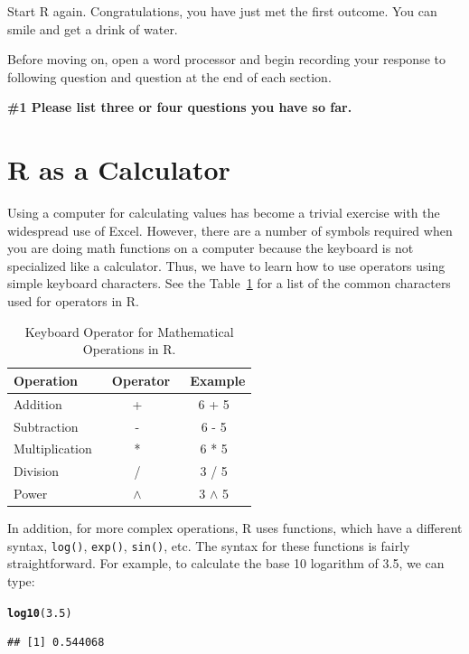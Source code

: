 \documentclass{tufte-handout}\usepackage[]{graphicx}\usepackage[]{xcolor}
\makeatletter
\newcommand{\hlnum}[1]{\textcolor[rgb]{0.686,0.059,0.569}{#1}}%
\newcommand{\hlstd}[1]{\textcolor[rgb]{0.345,0.345,0.345}{#1}}%
\newcommand{\hlkwd}[1]{\textcolor[rgb]{0.737,0.353,0.396}{\textbf{#1}}}%
\newenvironment{kframe}{%
 \def\at@end@of@kframe{}%
 \ifinner\ifhmode%
  \def\at@end@of@kframe{\end{minipage}}%
  \begin{minipage}{\columnwidth}%
 \fi\fi%
 \def\FrameCommand##1{\hskip\@totalleftmargin \hskip-\fboxsep
 \colorbox{shadecolor}{##1}\hskip-\fboxsep
     \hskip-\linewidth \hskip-\@totalleftmargin \hskip\columnwidth}%
 \MakeFramed {\advance\hsize-\width
   \@totalleftmargin\z@ \linewidth\hsize
   \@setminipage}}%
 {\par\unskip\endMakeFramed%
 \at@end@of@kframe}
\newenvironment{knitrout}{}{} %
\makeatother
\begin{document}
Start R again. Congratulations, you have just met the first outcome. You can smile and get a drink of water.

Before moving on, open a word processor and begin recording your response to following question and question at the end of each section.

\bigskip
\noindent \textbf{\#1 Please list three or four questions you have so far. }

\section{R as a Calculator}

Using a computer for calculating values has become a trivial exercise with the widespread use of Excel. However, there are a number of symbols required when you are doing math functions on a computer because the keyboard is not specialized like a calculator. Thus, we have to learn how to use operators using simple keyboard characters. See the Table~\ref{tab:KeyboardOperators} for a list of the common characters used for operators in R.

\begin{table}
	\begin{center}
	\begin{tabular}{lcc}
		\toprule
Operation &\ Operator &\ Example \\
\midrule
Addition & + &  6 + 5  \\  
Subtraction & - & 6 - 5 \\
Multiplication & * & 6 * 5 \\
Division & / & 3 / 5\\
Power & $\wedge$ & 3 $\wedge$ 5  \\
\bottomrule
\end{tabular}
\end{center}	
\caption{Keyboard Operator for Mathematical Operations in R.}
	\label{tab:KeyboardOperators}
\end{table}

In addition, for more complex operations, R uses functions, which have a different syntax, \eg \texttt{log()}, \texttt{exp()}, \texttt{sin()}, etc. The syntax for these functions is fairly straightforward. For example, to calculate the base 10 logarithm of 3.5, we can type:

\begin{knitrout}
\color{fgcolor}\begin{kframe}
\begin{alltt}
\hlkwd{log10}\hlstd{(}\hlnum{3.5}\hlstd{)}
\end{alltt}
\begin{verbatim}
## [1] 0.544068
\end{verbatim}
\end{kframe}
\end{knitrout}
\end{document}
